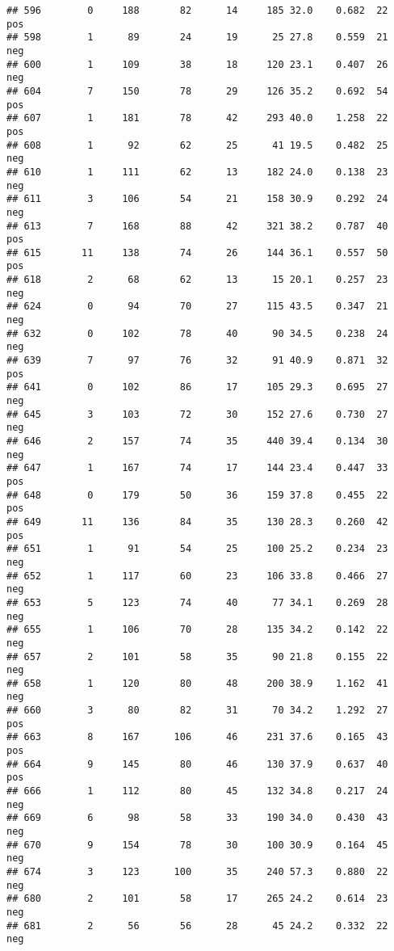 \documentclass[
]{article}
\begin{document}
\begin{verbatim}
## 596        0     188       82      14     185 32.0    0.682  22      pos
## 598        1      89       24      19      25 27.8    0.559  21      neg
## 600        1     109       38      18     120 23.1    0.407  26      neg
## 604        7     150       78      29     126 35.2    0.692  54      pos
## 607        1     181       78      42     293 40.0    1.258  22      pos
## 608        1      92       62      25      41 19.5    0.482  25      neg
## 610        1     111       62      13     182 24.0    0.138  23      neg
## 611        3     106       54      21     158 30.9    0.292  24      neg
## 613        7     168       88      42     321 38.2    0.787  40      pos
## 615       11     138       74      26     144 36.1    0.557  50      pos
## 618        2      68       62      13      15 20.1    0.257  23      neg
## 624        0      94       70      27     115 43.5    0.347  21      neg
## 632        0     102       78      40      90 34.5    0.238  24      neg
## 639        7      97       76      32      91 40.9    0.871  32      pos
## 641        0     102       86      17     105 29.3    0.695  27      neg
## 645        3     103       72      30     152 27.6    0.730  27      neg
## 646        2     157       74      35     440 39.4    0.134  30      neg
## 647        1     167       74      17     144 23.4    0.447  33      pos
## 648        0     179       50      36     159 37.8    0.455  22      pos
## 649       11     136       84      35     130 28.3    0.260  42      pos
## 651        1      91       54      25     100 25.2    0.234  23      neg
## 652        1     117       60      23     106 33.8    0.466  27      neg
## 653        5     123       74      40      77 34.1    0.269  28      neg
## 655        1     106       70      28     135 34.2    0.142  22      neg
## 657        2     101       58      35      90 21.8    0.155  22      neg
## 658        1     120       80      48     200 38.9    1.162  41      neg
## 660        3      80       82      31      70 34.2    1.292  27      pos
## 663        8     167      106      46     231 37.6    0.165  43      pos
## 664        9     145       80      46     130 37.9    0.637  40      pos
## 666        1     112       80      45     132 34.8    0.217  24      neg
## 669        6      98       58      33     190 34.0    0.430  43      neg
## 670        9     154       78      30     100 30.9    0.164  45      neg
## 674        3     123      100      35     240 57.3    0.880  22      neg
## 680        2     101       58      17     265 24.2    0.614  23      neg
## 681        2      56       56      28      45 24.2    0.332  22      neg

\end{verbatim}
\end{document}
